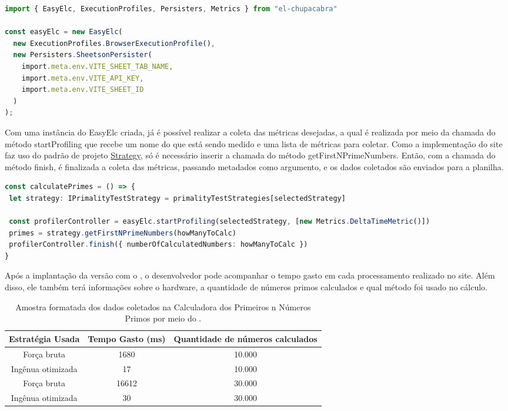 \documentclass[12pt]{tcc}
\begin{document}
\begin{lstlisting}[label={lst:easyelc_setup}, caption={Instância do módulo EasyElc no site Calculadora dos Primeiros n Números Primos.}, language=TypeScript, breaklines=true]
import { EasyElc, ExecutionProfiles, Persisters, Metrics } from "el-chupacabra"

const easyElc = new EasyElc(
  new ExecutionProfiles.BrowserExecutionProfile(),
  new Persisters.SheetsonPersister(
    import.meta.env.VITE_SHEET_TAB_NAME,
    import.meta.env.VITE_API_KEY,
    import.meta.env.VITE_SHEET_ID
  )
);
\end{lstlisting}

Com uma instância do EasyElc criada, já é possível realizar a coleta das métricas desejadas, a qual é realizada por meio da chamada do método startProfiling que recebe um nome do que está sendo medido e uma lista de métricas para coletar.
Como a implementação do site faz uso do padrão de projeto \hyperref[subsection:strategy]{Strategy}, só é necessário inserir a chamada do método getFirstNPrimeNumbers.
Então, com a chamada do método finish, é finalizada a coleta das métricas, passando metadados como argumento, e os dados coletados são enviados para a planilha.

\begin{lstlisting}[label={lst:easyelc_usage_firstnprimes}, caption={Coleta de métricas usando o EasyElc no site Calculadora dos Primeiros n Números Primos.}, language=TypeScript, breaklines=true]
const calculatePrimes = () => {
 let strategy: IPrimalityTestStrategy = primalityTestStrategies[selectedStrategy]

 const profilerController = easyElc.startProfiling(selectedStrategy, [new Metrics.DeltaTimeMetric()])
 primes = strategy.getFirstNPrimeNumbers(howManyToCalc)
 profilerController.finish({ numberOfCalculatedNumbers: howManyToCalc })
}
\end{lstlisting}

Após a implantação da versão com o , o desenvolvedor pode acompanhar o tempo gasto em cada processamento realizado no site.
Além disso, ele também terá informações sobre o hardware, a quantidade de números primos calculados e qual método foi usado no cálculo.

\begin{table}[!h]
    \centering
    \caption{Amostra formatada dos dados coletados na Calculadora dos Primeiros n Números Primos por meio do .}
    \begin{tabular}{|c|c|c|}
        \hline
        Estratégia Usada & Tempo Gasto (ms) & Quantidade de números calculados\\
        \hline
		Força bruta & 1680 & 10.000 \\
        \hline
		Ingênua otimizada & 17 & 10.000 \\
        \hline
		Força bruta & 16612 & 30.000 \\
        \hline
        Ingênua otimizada & 30 & 30.000 \\
        \hline
    \end{tabular}
\end{table}
\end{document}
